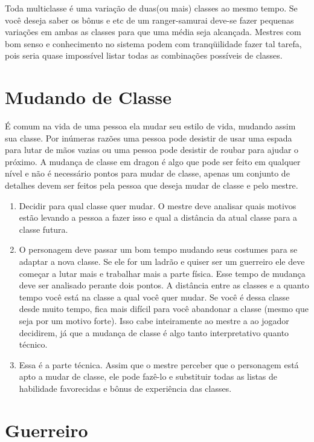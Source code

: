 Toda multiclasse é uma variação de duas(ou mais) classes ao mesmo tempo. Se você deseja saber os bônus e etc de um ranger-samurai deve-se fazer pequenas variações em ambas as classes para que uma média seja alcançada. Mestres com bom senso e conhecimento no sistema podem com tranqüilidade fazer tal tarefa, pois seria quase impossível listar todas as combinações possíveis de classes.

\section{Mudando de Classe}

É comum na vida de uma pessoa ela mudar seu estilo de vida, mudando assim sua classe. Por inúmeras razões uma pessoa pode desistir de usar uma espada para lutar de mãos vazias ou uma pessoa pode desistir de roubar para ajudar o próximo. A mudança de classe em dragon é algo que pode ser feito em qualquer nível e não é necessário pontos para mudar de classe, apenas um conjunto de detalhes devem ser feitos pela pessoa que deseja mudar de classe e pelo mestre.

\begin{enumerate}
	\item Decidir para qual classe quer mudar. O mestre deve analisar quais motivos estão levando a pessoa a fazer isso e qual a distância da atual classe para a classe futura.
	\item O personagem deve passar um bom tempo mudando seus costumes para se adaptar a nova classe. Se ele for um ladrão e quiser ser um guerreiro ele deve começar a lutar mais e trabalhar mais a parte física.
     Esse tempo de mudança deve ser analisado perante dois pontos. A distância entre as classes e a quanto tempo você está na classe a qual você quer mudar. Se você é dessa classe desde muito tempo, fica mais difícil para você abandonar a classe (mesmo que seja por um motivo forte). Isso cabe inteiramente ao mestre a ao jogador decidirem, já que a mudança de classe é algo tanto interpretativo quanto técnico.
	\item Essa é a parte técnica. Assim que o mestre perceber que o personagem está apto a mudar de classe, ele pode fazê-lo e substituir todas as listas de habilidade favorecidas e bônus de experiência das classes.
\end{enumerate}


\section{Guerreiro}

